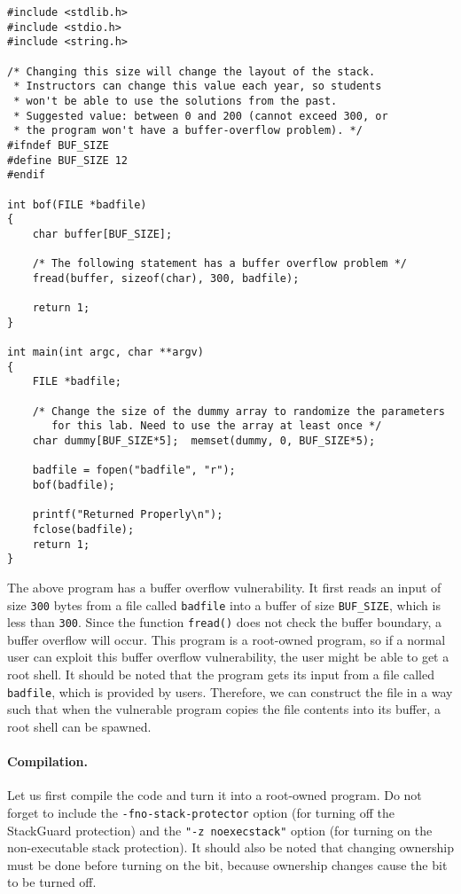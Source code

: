 \begin{lstlisting}[caption={The vulnerable program \texttt{retlib.c}}]
#include <stdlib.h>
#include <stdio.h>
#include <string.h>

/* Changing this size will change the layout of the stack.
 * Instructors can change this value each year, so students
 * won't be able to use the solutions from the past.
 * Suggested value: between 0 and 200 (cannot exceed 300, or 
 * the program won't have a buffer-overflow problem). */
#ifndef BUF_SIZE
#define BUF_SIZE 12 
#endif

int bof(FILE *badfile)
{
    char buffer[BUF_SIZE];

    /* The following statement has a buffer overflow problem */
    fread(buffer, sizeof(char), 300, badfile);

    return 1;
}

int main(int argc, char **argv)
{
    FILE *badfile;

    /* Change the size of the dummy array to randomize the parameters
       for this lab. Need to use the array at least once */
    char dummy[BUF_SIZE*5];  memset(dummy, 0, BUF_SIZE*5);

    badfile = fopen("badfile", "r");
    bof(badfile);

    printf("Returned Properly\n");
    fclose(badfile);
    return 1;
}
\end{lstlisting}


The above program has a buffer overflow vulnerability. It first reads
an input of size \texttt{300} bytes from a file called \texttt{badfile} into a buffer
of size \texttt{BUF\_SIZE}, which is less than \texttt{300}.
Since the function \texttt{fread()} does not check
the buffer boundary, a buffer overflow will occur.
This program is a root-owned \setuid program, so if a normal user can exploit this buffer
overflow vulnerability, the user might be able to get a root
shell.  It should be noted that the program gets its input from a file
called \texttt{badfile}, which is provided by users. Therefore, we can
construct the file in a way such that when
the vulnerable program copies the file contents into its buffer, a root
shell can be spawned. 



\vspace{0.1in}
\paragraph{Compilation.}
Let us first compile the code and turn it into a root-owned \setuid
program. Do not forget to include the 
\texttt{-fno-stack-protector} option (for turning off the StackGuard
protection) and the \texttt{"-z noexecstack"} option (for turning on
the non-executable stack protection). 
It should also be noted that changing ownership must be done before
turning on the \setuid bit, 
because ownership changes cause the \setuid bit to be turned off.


